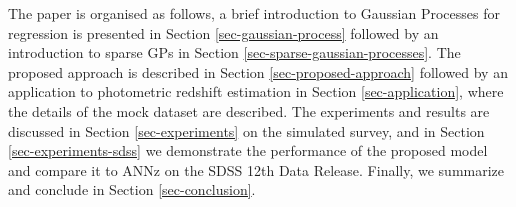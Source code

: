 \documentclass[useAMS,usenatbib,fleqn]{mn2e}
\begin{document}
The paper is organised as follows, a brief introduction to Gaussian Processes for regression is presented in Section \ref{sec-gaussian-process} followed by an introduction to sparse GPs in Section \ref{sec-sparse-gaussian-processes}. The proposed approach is described in Section \ref{sec-proposed-approach} followed by an application to photometric redshift estimation in Section \ref{sec-application}, where the details of the mock dataset are described. The experiments and results are discussed in Section \ref{sec-experiments} on the simulated survey, and in Section \ref{sec-experiments-sdss} we demonstrate the performance of the proposed model and compare it to ANNz on the SDSS 12th Data Release. Finally, we summarize and conclude in Section \ref{sec-conclusion}. %
\end{document}
